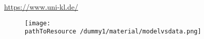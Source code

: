 
\url{https://www.uni-kl.de/}

\begin{figure}[h!]
	\centering
	\texttt{[image: \\pathToResource /dummy1/material/modelvsdata.png]}
\end{figure}
\cite{Dahmen}


